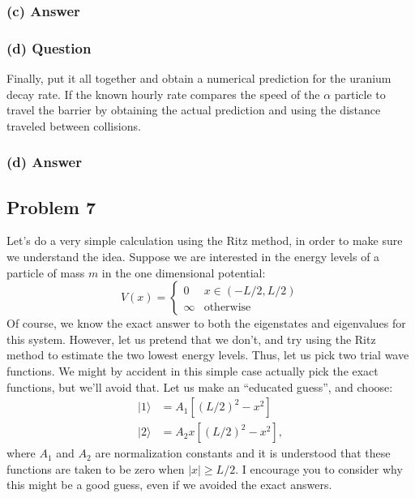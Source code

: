 \documentclass{article}
\begin{document}
\subsubsection*{(c) Answer}

\subsubsection*{(d) Question}
Finally, put it all together and obtain a numerical prediction for the uranium decay rate. If the known hourly rate compares the speed of the \( \alpha \) particle to travel the barrier by obtaining the actual prediction and using the distance traveled between collisions.

\subsubsection*{(d) Answer}

\subsection*{Problem 7}
Let's do a very simple calculation using the Ritz method, in order to make sure we understand the idea. Suppose we are interested in the energy levels of a particle of mass \( m \) in the one dimensional potential:
\begin{equation}
    V(x) = \begin{cases}
    0 & x \in (-L/2, L/2) \\
    \infty & \text{otherwise}
    \end{cases}
\end{equation}
Of course, we know the exact answer to both the eigenstates and eigenvalues for this system. However, let us pretend that we don't, and try using the Ritz method to estimate the two lowest energy levels. Thus, let us pick two trial wave functions. We might by accident in this simple case actually pick the exact functions, but we'll avoid that. Let us make an ``educated guess'', and choose:
\begin{align}
    |1\rangle &= A_1 \left[ (L/2)^2 - x^2 \right] \\
    |2\rangle &= A_2 x \left[ (L/2)^2 - x^2 \right],
\end{align}
where \( A_1 \) and \( A_2 \) are normalization constants and it is understood that these functions are taken to be zero when \( |x| \geq L/2 \). I encourage you to consider why this might be a good guess, even if we avoided the exact answers.
\end{document}
